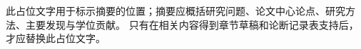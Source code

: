 \begin{storyabstract}[zh]
    此占位文字用于标示摘要的位置；摘要应概括研究问题、论文中心论点、研究方法、主要发现与学位贡献。
    只有在相关内容得到章节草稿和论断记录表支持后，才应替换此占位文字。
\end{storyabstract}
